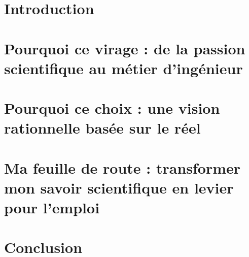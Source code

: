 \documentclass[a4paper,12pt]{article}
\begin{document}


\tableofcontents
\newpage

\section*{Introduction}

\newpage

\section{Pourquoi ce virage : de la passion scientifique au métier d'ingénieur}

\section{Pourquoi ce choix : une vision rationnelle basée sur le réel}

\section{Ma feuille de route : transformer mon savoir scientifique en levier pour l'emploi}


\newpage
\section*{Conclusion}


\newpage
\end{document}
